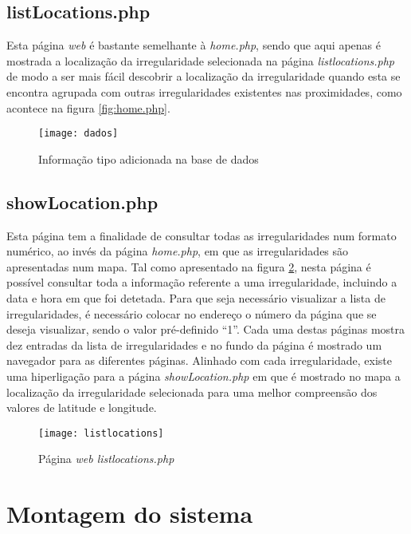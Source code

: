 \subsection{listLocations.php}
\label{sub:listlocations.php}

Esta página \emph{web} é bastante semelhante à \emph{home.php}, sendo que aqui apenas é mostrada a localização da irregularidade selecionada na página \emph{listlocations.php} de modo a ser mais fácil descobrir a localização da irregularidade quando esta se encontra agrupada com outras irregularidades existentes nas proximidades, como acontece na figura \ref{fig:home.php}.

\begin{figure}[htbp]
	\centering
	\texttt{[image: dados]}
	\caption{Informação tipo adicionada na base de dados}
	\label{fig:informacao_tipo_adicionada_na_base_de_dados}
\end{figure}

\subsection{showLocation.php}
\label{sub:showLocation.php}

Esta página tem a finalidade de consultar todas as irregularidades num formato numérico, ao invés da página \emph{home.php}, em que as irregularidades são apresentadas num mapa.
Tal como apresentado na figura \ref{fig:listlocations.php}, nesta página é possível consultar toda a informação referente a uma irregularidade, incluindo a data e hora em que foi detetada.
Para que seja necessário visualizar a lista de irregularidades, é necessário colocar no endereço o número da página que se deseja visualizar, sendo o valor pré-definido “1”.
Cada uma destas páginas mostra dez entradas da lista de irregularidades e no fundo da página é mostrado um navegador para as diferentes páginas. 
Alinhado com cada irregularidade, existe uma hiperligação para a página \emph{showLocation.php} em que é mostrado no mapa a localização da irregularidade selecionada para uma melhor compreensão dos valores de latitude e longitude.

\begin{figure}[htbp]
	\centering
	\texttt{[image: listlocations]}
	\caption{Página \emph{web listlocations.php}}
	\label{fig:listlocations.php}
\end{figure}

\section{Montagem do sistema}
\label{sec:montagem_do_sistema}

